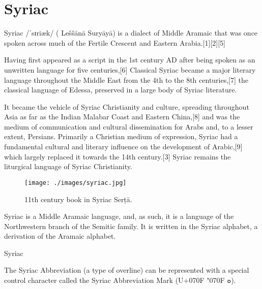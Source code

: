 \section{Syriac}

\newfontfamily{}

Syriac /ˈsɪriæk/ ({} Leššānā Suryāyā) is a dialect of Middle Aramaic that was once spoken across much of the Fertile Crescent and Eastern Arabia.[1][2][5] 

Having first appeared as a script in the 1st century AD after being spoken as an unwritten language for five centuries,[6] Classical Syriac became a major literary language throughout the Middle East from the 4th to the 8th centuries,[7] the classical language of Edessa, preserved in a large body of Syriac literature.


It became the vehicle of Syriac Christianity and culture, spreading throughout Asia as far as the Indian Malabar Coast and Eastern China,[8] and was the medium of communication and cultural dissemination for Arabs and, to a lesser extent, Persians. Primarily a Christian medium of expression, Syriac had a fundamental cultural and literary influence on the development of Arabic,[9] which largely replaced it towards the 14th century.[3] Syriac remains the liturgical language of Syriac Christianity.

\begin{figure}[htb]
\centering
\texttt{[image: ./images/syriac.jpg]}
\caption{11th century book in Syriac Serṭā.}
\end{figure}

Syriac is a Middle Aramaic language, and, as such, it is a language of the Northwestern branch of the Semitic family. It is written in the Syriac alphabet, a derivation of the Aramaic alphabet.

\begin{scriptexample}[]{Syriac}
\end{scriptexample}

The Syriac Abbreviation (a type of overline) can be represented with a special control character called the Syriac Abbreviation Mark (U+070F {\syriac \char"070F ܘ}).


^^A



